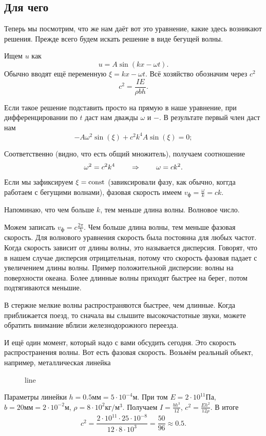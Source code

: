 \subsection{Для чего}
Теперь мы посмотрим, что же нам даёт вот это уравнение, какие здесь возникают решения. Прежде всего будем искать решение в виде бегущей волны.

Ищем $u$ как
\[
  u = A \sin(kx - \omega t).
\]
Обычно вводят ещё переменную $\xi = kx - \omega t$.
Всё хозяйство обозначим через $c^2$
\[
  c^2 = \frac{IE}{\rho b h}.
\]

Если такое решение подставить просто на прямую в наше уравнение, при дифференцировании по $t$ даст нам дважды $\omega$ и $-$. В результате первый член даст нам
\[
  - A \omega^2 \sin(\xi) + c^2 k^4 A \sin(\xi) = 0;
\]

Соответственно (видно, что есть общий множитель), получаем соотношение
\[
  \omega^2 = c^2k^4\qquad \imp \qquad \omega = ck^2.
\]

Если мы зафиксируем $\xi=\operatorname{const}$ (завиксировали фазу, как обычно, коггда работаем с бегущими волнами), фазовая скорость имеем $v_\text{ф} = \frac{\omega}{k} = ck$.

Напоминаю, что чем больше $k$, тем меньше длина волны. Волновое число.

Можем записать $v_\text{ф} = c\frac{2\pi}\lambda$. Чем больше длина волны, тем меньше фазовая скорость.
Для волнового уравнения скорость была постоянна для любых частот.
Когда скорость зависит от длины волны, это называется дисперсия. Говорят, что в нашем случае дисперсия отрицательная, потому что скорость фазовая падает с увеличением длины волны.
Пример положительной дисперсии: волны на поверхности океана. Более длинные волны приходят быстрее на берег, потом подтягиваются меньшие.

В стержне мелкие волны распространяются быстрее, чем длинные. Когда приближается поезд, то сначала вы слышите высокочастотные звуки, можете обратить внимание вблизи железнодорожного переезда.

И ещё один момент, который надо с вами обсудить сегодня. Это скорость распространения волны.
Вот есть фазовая скорость. Возьмём реальный объект, например, металлическая линейка
\begin{figure}[H]
  \centering
  \caption{line}
  \label{fig:line}
\end{figure}
Параметры линейки $h = 0.5\text{мм} = 5\cdot 10^{-4}\text{м}$. При том $E = 2\cdot 10^{11}\text{Па}$, $b = 20\text{мм} = 2\cdot 10^{-2}\text{м}$, $\rho = 8\cdot 10^2 \text{кг}/\text{м}^3$.
Получаем $I = \frac{bh^3}{12}$, $c^2 = \frac{E h^2}{12\rho}$. В итоге
\[
  c^2 = \frac{2\cdot 10^{11}\cdot 25 \cdot 10^{-8}}{12\cdot 8\cdot 10^3} = \frac{50}{96} \approx 0.5.
\]

